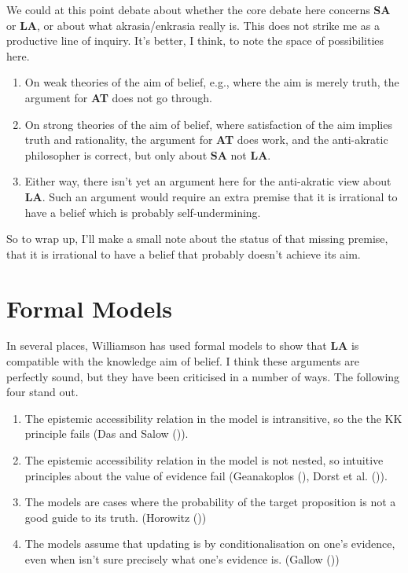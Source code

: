\documentclass[
  11pt,
  letterpaper,
  DIV=11,
  numbers=noendperiod,
  twoside]{scrartcl}
\providecommand{\tightlist}{%
  \setlength{\itemsep}{0pt}\setlength{\parskip}{0pt}}
\begin{document}
We could at this point debate about whether the core debate here
concerns \textbf{SA} or \textbf{LA}, or about what akrasia/enkrasia
really is. This does not strike me as a productive line of inquiry. It's
better, I think, to note the space of possibilities here.

\begin{enumerate}
\def\labelenumi{\arabic{enumi}.}
\tightlist
\item
  On weak theories of the aim of belief, e.g., where the aim is merely
  truth, the argument for \textbf{AT} does not go through.
\item
  On strong theories of the aim of belief, where satisfaction of the aim
  implies truth and rationality, the argument for \textbf{AT} does work,
  and the anti-akratic philosopher is correct, but only about
  \textbf{SA} not \textbf{LA}.
\item
  Either way, there isn't yet an argument here for the anti-akratic view
  about \textbf{LA}. Such an argument would require an extra premise
  that it is irrational to have a belief which is probably
  self-undermining.
\end{enumerate}

So to wrap up, I'll make a small note about the status of that missing
premise, that it is irrational to have a belief that probably doesn't
achieve its aim.

\section{Formal Models}\label{sec-model}

In several places, Williamson has used formal models to show that
\textbf{LA} is compatible with the knowledge aim of belief. I think
these arguments are perfectly sound, but they have been criticised in a
number of ways. The following four stand out.

\begin{enumerate}
\def\labelenumi{\arabic{enumi}.}
\tightlist
\item
  The epistemic accessibility relation in the model is intransitive, so
  the the KK principle fails (Das and Salow
  ()).
\item
  The epistemic accessibility relation in the model is not nested, so
  intuitive principles about the value of evidence fail (Geanakoplos
  (), Dorst et al.
  ()).
\item
  The models are cases where the probability of the target proposition
  is not a good guide to its truth. (Horowitz
  ())
\item
  The models assume that updating is by conditionalisation on one's
  evidence, even when isn't sure precisely what one's evidence is.
  (Gallow ())
\end{enumerate}
\end{document}
